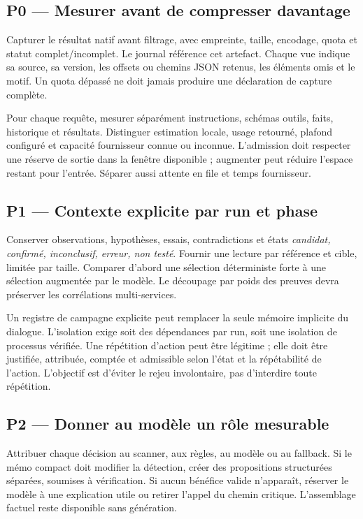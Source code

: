 \documentclass[11pt,a4paper]{article}
\newcommand{\code}[1]{{\small\ttfamily\path{#1}}}
\begin{document}
\subsection{P0 — Mesurer avant de compresser davantage}
Capturer le résultat natif avant filtrage, avec empreinte, taille, encodage, quota et statut complet/incomplet. Le journal référence cet artefact. Chaque vue indique sa source, sa version, les offsets ou chemins JSON retenus, les éléments omis et le motif. Un quota dépassé ne doit jamais produire une déclaration de capture complète.

Pour chaque requête, mesurer séparément instructions, schémas outils, faits, historique et résultats. Distinguer estimation locale, usage retourné, plafond configuré et capacité fournisseur connue ou inconnue. L'admission doit respecter une réserve de sortie dans la fenêtre disponible ; augmenter \code{max_tokens} peut réduire l'espace restant pour l'entrée. Séparer aussi attente en file et temps fournisseur.

\subsection{P1 — Contexte explicite par run et phase}
Conserver observations, hypothèses, essais, contradictions et états \emph{candidat, confirmé, inconclusif, erreur, non testé}. Fournir une lecture par référence et cible, limitée par taille. Comparer d'abord une sélection déterministe forte à une sélection augmentée par le modèle. Le découpage par poids des preuves devra préserver les corrélations multi-services.

Un registre de campagne explicite peut remplacer la seule mémoire implicite du dialogue. L'isolation exige soit des dépendances par run, soit une isolation de processus vérifiée. Une répétition d'action peut être légitime ; elle doit être justifiée, attribuée, comptée et admissible selon l'état et la répétabilité de l'action. L'objectif est d'éviter le rejeu involontaire, pas d'interdire toute répétition.

\subsection{P2 — Donner au modèle un rôle mesurable}
Attribuer chaque décision au scanner, aux règles, au modèle ou au fallback. Si le mémo compact doit modifier la détection, créer des propositions structurées séparées, soumises à vérification. Si aucun bénéfice valide n'apparaît, réserver le modèle à une explication utile ou retirer l'appel du chemin critique. L'assemblage factuel reste disponible sans génération.
\end{document}

